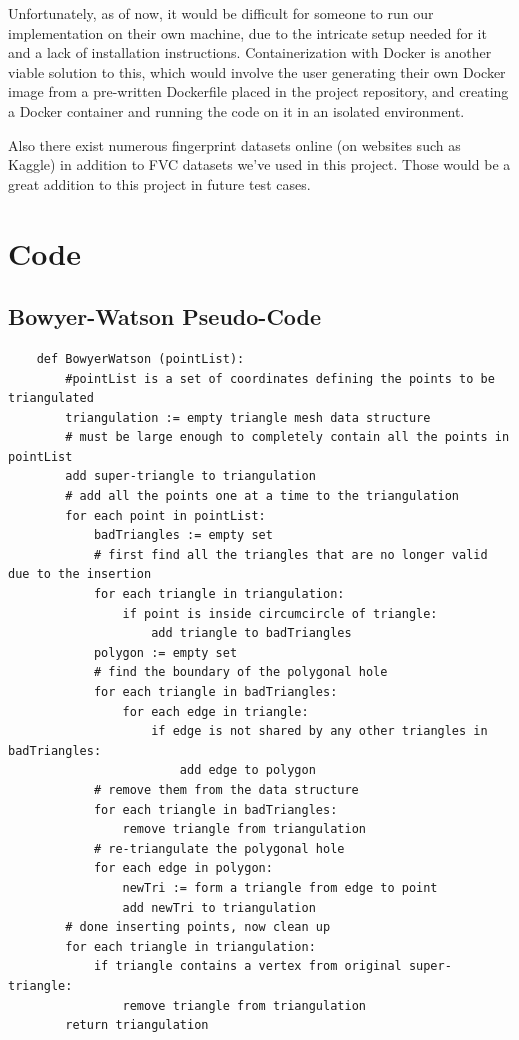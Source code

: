 \documentclass[fyp]{socreport}
\begin{document}
Unfortunately, as of now, it would be difficult for someone to run our implementation on their own machine, due to the intricate setup needed for it and a lack of installation instructions. Containerization with Docker is another viable solution to this, which would involve the user generating their own Docker image from a pre-written Dockerfile placed in the project repository, and creating a Docker container and running the code on it in an isolated environment.

Also there exist numerous fingerprint datasets online (on websites such as Kaggle) in addition to FVC datasets we've used in this project. Those would be a great addition to this project in future test cases.




\appendix
\chapter{Code}
\section{Bowyer-Watson Pseudo-Code}
\label{code:a1}
\begin{lstlisting}
	def BowyerWatson (pointList):
		#pointList is a set of coordinates defining the points to be triangulated
		triangulation := empty triangle mesh data structure
		# must be large enough to completely contain all the points in pointList
		add super-triangle to triangulation 
		# add all the points one at a time to the triangulation
		for each point in pointList: 
			badTriangles := empty set
			# first find all the triangles that are no longer valid due to the insertion
			for each triangle in triangulation: 
				if point is inside circumcircle of triangle:
					add triangle to badTriangles
			polygon := empty set
			# find the boundary of the polygonal hole
			for each triangle in badTriangles: 
				for each edge in triangle:
					if edge is not shared by any other triangles in badTriangles:
						add edge to polygon
			# remove them from the data structure
			for each triangle in badTriangles:
				remove triangle from triangulation
			# re-triangulate the polygonal hole
			for each edge in polygon:
				newTri := form a triangle from edge to point
				add newTri to triangulation
		# done inserting points, now clean up
		for each triangle in triangulation:
			if triangle contains a vertex from original super-triangle:
				remove triangle from triangulation
		return triangulation
\end{lstlisting}
\end{document}
